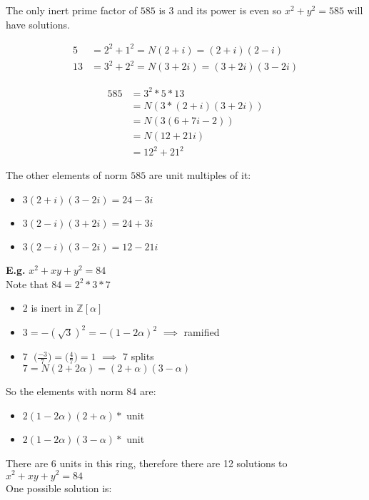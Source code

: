 \documentclass[11pt]{article}
\begin{document}
The only inert prime factor of $585$ is $3$ and its power is even so $x^2+y^2 = 585$ will have solutions.

\begin{align*}
	5 &= 2^2 + 1^2 = N(2+i) = (2+i)(2-i)\\
	13 &=3^2 + 2^2 = N(3+2i) = (3+2i)(3-2i)
\end{align*}

\begin{align*}
	585 &=  3^2 *5 * 13\\
	   &= N(3*(2+i)(3+2i))\\
	   &= N(3(6+7i-2))\\
	   &=N(12+21i)\\
	   &=12^2+21^2
\end{align*}
 
The other elements of norm $585$ are unit multiples of it:

\begin{itemize}
	\item{$3(2+i)(3-2i) = 24-3i$}
	\item{$3(2-i)(3+2i) = 24+3i$}
	\item{$3(2-i)(3-2i) = 12-21i$}
\end{itemize}



$ $\\
\textbf{E.g.} $x^2 +xy+y^2 = 84 $\\ 

Note that $84 = 2^2*3*7$


\begin{itemize}
	\item{$2$ is inert in $\mathbb{Z}[\alpha]$}
	\item{$3 = -(\sqrt{3} )^2 = -(1-2\alpha)^2 $ $\implies$ ramified}
	\item{$7 \hspace{7pt}\Big (\frac{-3}{7} \Big)  = \Big (\frac{4}{7} \Big ) = 1 $ $\implies$ 7 splits \\[1em] $7 = N(2+2\alpha) = (2+\alpha) (3-\alpha)$} 
\end{itemize}


So the elements with norm $84$ are:

\begin{itemize}
	\item{$2(1-2\alpha)(2+\alpha)*$ unit }
	\item{$2(1-2\alpha)(3-\alpha)*$ unit }
\end{itemize}
There are 6 units in this ring, therefore there are 12 solutions to $x^2 + xy +y^2 = 84$\\[1em]
One possible solution is:
\end{document}
